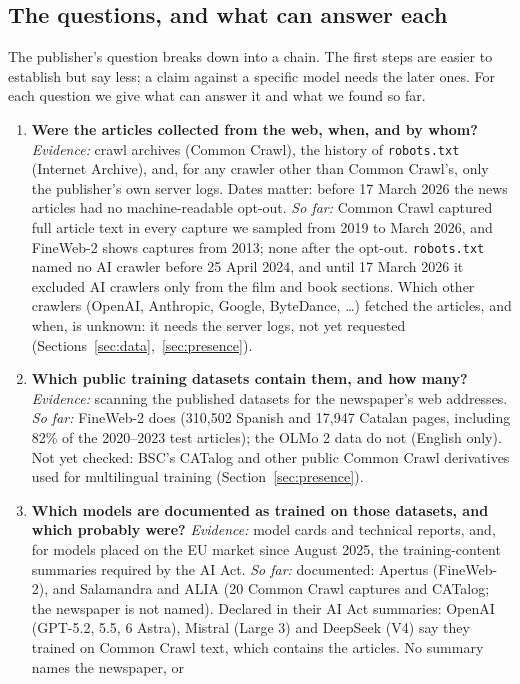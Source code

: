 \documentclass[10pt,a4paper]{article}
\begin{document}
\subsection{The questions, and what can answer each}\label{sec:questions}
The publisher's question breaks down into a chain. The first steps are easier to establish but say less; a claim
against a specific model needs the later ones. For each question we give what can answer it and what we found so far.
\begin{enumerate}[leftmargin=*,itemsep=3pt]
\item \textbf{Were the articles collected from the web, when, and by whom?}
\emph{Evidence:} crawl archives (Common Crawl), the history of \texttt{robots.txt} (Internet Archive), and, for any
crawler other than Common Crawl's, only the publisher's own server logs. Dates matter: before 17 March 2026 the
news articles had no machine-readable opt-out.
\emph{So far:} Common Crawl captured full article text in every capture we sampled from 2019 to March 2026, and
FineWeb-2 shows captures from 2013; none after the opt-out. \texttt{robots.txt} named no AI crawler before 25
April 2024, and until 17 March 2026 it excluded AI crawlers only from the film and book sections. Which other
crawlers (OpenAI, Anthropic, Google, ByteDance, \ldots) fetched the articles, and when, is unknown: it needs the
server logs, not yet requested (Sections~\ref{sec:data},~\ref{sec:presence}).
\item \textbf{Which public training datasets contain them, and how many?}
\emph{Evidence:} scanning the published datasets for the newspaper's web addresses.
\emph{So far:} FineWeb-2 does (310,502 Spanish and 17,947 Catalan pages, including 82\% of the 2020--2023 test
articles); the OLMo 2 data do not (English only). Not yet checked: BSC's CATalog and other public Common Crawl
derivatives used for multilingual training (Section~\ref{sec:presence}).
\item \textbf{Which models are documented as trained on those datasets, and which probably were?}
\emph{Evidence:} model cards and technical reports, and, for models placed on the EU market since August 2025, the
training-content summaries required by the AI Act.
\emph{So far:} documented: Apertus (FineWeb-2), and Salamandra and ALIA (20 Common Crawl captures and CATalog; the
newspaper is not named). Declared in their AI Act summaries: OpenAI (GPT-5.2, 5.5, 6 Astra), Mistral (Large 3) and
DeepSeek (V4) say they trained on Common Crawl text, which contains the articles. No summary names the newspaper, or

\end{enumerate}
\end{document}
